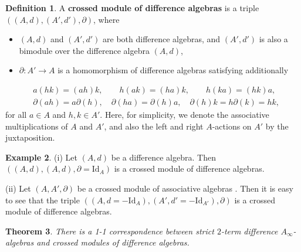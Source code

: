 \documentclass[a4paper,reqno,10pt]{amsart}
\theoremstyle{plain}
\newtheorem{thm}{Theorem}[section]
\theoremstyle{definition}
\newtheorem{defn}[thm]{Definition}
\newtheorem{exam}[thm]{Example}
\theoremstyle{remark}
\begin{document}
\begin{defn}
    A {\bf crossed module of difference algebras} is a triple $((A, d), (A', d'), \partial )$, where
    \begin{itemize}
        \item[-] $(A, d)$ and $(A', d')$ are both difference algebras, and $(A', d')$ is also a bimodule over the difference algebra $(A, d)$,   
        \item[-] $\partial : A' \rightarrow A$ is a homomorphism of difference algebras satisfying additionally
    \end{itemize}
    \begin{align}
        &a (hk) = (ah) k, \qquad h (ak) = (ha)k, \qquad h (ka) = (hk) a, \label{crm1}\\
        & \partial (ah) = a \partial (h), \quad \partial (ha ) = \partial (h) a, \quad  \partial (h) k = h \partial (k) = hk, \label{crm2}
    \end{align}
    for all $a \in A$ and $h, k \in A'$. Here, for simplicity, we denote the associative multiplications of $A$ and $A'$, and also the left and right $A$-actions on $A'$ by the juxtaposition.
\end{defn}

\begin{exam}
(i) Let $(A, d)$ be a difference algebra. Then $((A, d), (A, d), \partial = \mathrm{Id}_A )$ is a crossed module of difference algebras.

\medskip

(ii) Let $(A, A', \partial)$ be a crossed module of associative algebras \cite{das-hom}. Then it is easy to see that the triple $((A, d = - \mathrm{Id}_A), (A' , d' = - \mathrm{Id}_{A'}), \partial )$ is a crossed module of difference algebras.
\end{exam}

\begin{thm}\label{thm-strict}
    There is a 1-1 correspondence between strict $2$-term difference $A_\infty$-algebras and crossed modules of difference algebras.
\end{thm}
\end{document}
